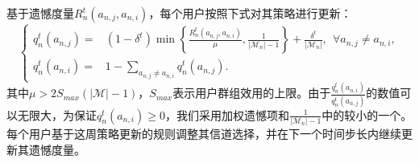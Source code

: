 基于遗憾度量$R_n^t(a_{n,j},a_{n,i})$，每个用户按照下式对其策略进行更新：
\vspace{-0.1cm}
\begin{equation}\label{eq:str2}
\begin{cases}
q^{t}_n(a_{n,j})=&(1-\delta^t)\min\left\{\frac{R^t_n(a_{n,j},a_{n,i})}{\mu},\frac{1}{|\mathcal{M}_n|-1}\right\}+\frac{\delta^t}{|\mathcal{M}_n|}, ~~\forall a_{n,j}\neq a_{n,i}, \\
q^{t}_n(a_{n,i})=&1-\sum_{a_{n,j}\neq a_{n,i}}q^t_n(a_{n,j}).
\end{cases}
\end{equation}
其中$\mu>2S_{max}(|\mathcal{M}|-1)$，$S_{max}$表示用户群组效用的上限。由于$\frac{q^t_n(a_{n,i})}{q^t_n(a_{n,j})}$的数值可以无限大，为保证$q^{t}_n(a_{n,i})\geq0$，我们采用加权遗憾项和$\frac{1}{|\mathcal{M}_n|-1}$中的较小的一个。每个用户基于这周策略更新的规则调整其信道选择，并在下一个时间步长内继续更新其遗憾度量。

